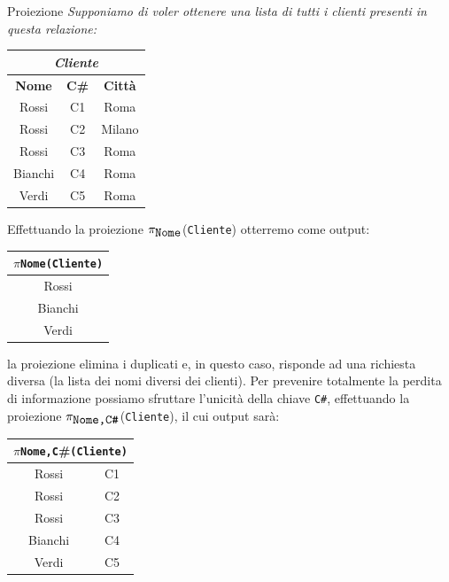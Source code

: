 \begin{Example}{Proiezione}{}
    \textit{Supponiamo di voler ottenere una lista di tutti i clienti presenti in questa relazione:}
    \begin{center}
        \begin{tabular}{|c|c|c|}
            \hline\multicolumn{3}{|c|}{\textit{Cliente}}\\\hline
            \textbf{Nome} & \textbf{C\#} & \textbf{Città}\\\hline
            Rossi & C1 & Roma\\
            Rossi & C2 & Milano\\
            Rossi & C3 & Roma\\
            Bianchi & C4 & Roma\\
            Verdi & C5 & Roma\\\hline 
        \end{tabular}
        \bigskip
    \end{center}
    Effettuando la proiezione $\pi_{\verb|Nome|}$(\verb|Cliente|) otterremo come output:
    \begin{center}
        \begin{tabular}{|c|}
            \hline\multicolumn{1}{|c|}{$\pi$\scriptsize{\Verb|Nome|}\normalsize\Verb|(Cliente)|}\\\hline
            Rossi\\
            Bianchi\\
            Verdi\\\hline
        \end{tabular}
    \end{center}
    la proiezione elimina i duplicati e, in questo caso, risponde ad una richiesta diversa (la lista dei nomi diversi dei clienti). Per prevenire totalmente la perdita di informazione possiamo sfruttare l'unicità della chiave \verb|C#|, effettuando la proiezione $\pi_{\verb|Nome,C#|}$(\verb|Cliente|), il cui output sarà:
    \begin{center}
        \begin{tabular}{|c|c|}
            \hline\multicolumn{2}{|c|}{$\pi$\scriptsize{\Verb|Nome,C|\#}\normalsize\Verb|(Cliente)|}\\\hline
            Rossi & C1\\
            Rossi & C2\\
            Rossi & C3\\
            Bianchi & C4\\
            Verdi & C5\\\hline
        \end{tabular}
    \end{center}
\end{Example}

